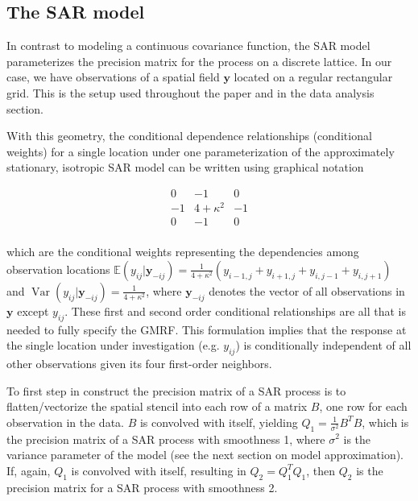 \documentclass[review]{elsarticle}
\begin{document}
\subsection{The SAR model}

In contrast to modeling a continuous covariance function, the SAR model parameterizes the precision matrix for the process on a discrete lattice. In our case, we have observations of a spatial field $\mathbf{y}$ located on a regular rectangular grid. This is the setup used throughout the paper and in the data analysis section. 

With this geometry, the conditional dependence relationships (conditional weights) for a single location under one parameterization of the approximately stationary, isotropic SAR model can be written using graphical notation

\begin{equation}
\label{e:2}
    \begin{array}{c|c|c}
      0 & -1 & 0 \\
      \hline
      -1 & 4+\kappa^2 & -1 \\
      \hline
      0 & -1 & 0 \\
    \end{array}
\end{equation} 

which are the conditional weights representing the dependencies among observation locations $\mathbb{E} (y_{ij} | \mathbf{y}_{-ij}) = \frac{1}{4+\kappa^2}(y_{i-1,j} + y_{i+1,j} + y_{i,j-1} + y_{i,j+1})$ and $\operatorname{Var}(y_{ij} | \mathbf{y}_{-ij}) =  \frac{1}{4+\kappa^2}$, where $ \mathbf{y}_{-ij}$ denotes the vector of all observations in $\mathbf y$ except $y_{ij}$. These first and second order conditional relationships are all that is needed to fully specify the GMRF. This formulation implies that the response at the single location under investigation (e.g. $y_{ij}$) is conditionally independent of all other observations given its four first-order neighbors. 

To first step in construct the precision matrix of a SAR process is to flatten/vectorize the spatial stencil into each row of a matrix $B$, one row for each observation in the data. $B$ is convolved with itself, yielding $Q_1 = \frac{1}{\sigma^2} B^T B$, which is the precision matrix of a SAR process with smoothness 1, where $\sigma^2$ is the variance parameter of the model (see the next section on model approximation). If, again, $Q_1$ is convolved with itself, resulting in $Q_2 = Q_1^T Q_1$, then $Q_2$ is the precision matrix for a SAR process with smoothness 2. 
\end{document}
